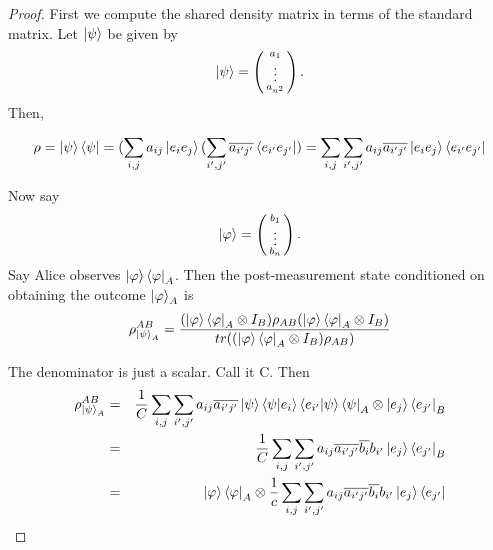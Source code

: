 \begin{proof}
First we compute the shared density matrix in terms of the standard matrix.  Let $\ket{\psi}$ be given by 
\begin{equation}
\ket{\psi}=\left(\begin{smallmatrix}a_1\\ \vdots \\a_{n^2}\end{smallmatrix}\right).
\end{equation}
Then, 

\begin{equation}
\rho=\ket{\psi}\bra{\psi}=(\sum_{i,j} a_{ij}\ket{e_i e_j}(\sum_{i',j'} \overline{a_{i'j'}}\bra{e_{i'} e_{j'}})=\sum_{i,j} \sum_{i',j'} a_{ij} \overline{a_{i'j'}}\ket{e_i e_j}\bra{e_{i'} e_{j'}}   
\end{equation}

Now say
\begin{equation}
\ket{\varphi}=\left(\begin{smallmatrix}b_1\\ \vdots \\b_n\end{smallmatrix}\right).
\end{equation}
Say Alice observes $\ket{\varphi}\bra{\varphi}_A$.
Then the post-measurement state conditioned on obtaining the outcome $\ket{\varphi}_A$ is
\begin{equation}
\rho_{\ket{\psi}_A}^{AB}=\frac{(\ket{\varphi}\bra{\varphi}_A \otimes I_B)\rho_{AB}(\ket{\varphi}\bra{\varphi}_A \otimes I_B)}{tr((\ket{\varphi}\bra{\varphi}_A \otimes I_B)\rho_{AB})}
\end{equation}

The denominator is just a scalar. Call it C. Then 
\begin{eqnarray}
\rho_{\ket{\psi}_A}^{AB}&=&\frac{1}{C} \sum_{i,j} \sum_{{i'}, {j'}} a_{ij} \overline{a_{i'j'}}\ket{\psi}\braket{\psi|e_i}\braket{e_{i'}|\psi}\bra{\psi}_A \otimes \ket{e_j}\bra{e_{j'}}_B\\
&=&\frac{1}{C} \sum_{i,j} \sum_{{i'}, {j'}} a_{ij} \overline{a_{i'j'}}\overline{b_i}b_{i'}\ket{e_j}\bra{e_{j'}}_B\\
&=&\ket{\varphi}\bra{\varphi}_A \otimes \frac{1}{c} \sum_{i,j} \sum_{{i'}, {j'}} a_{ij} \overline{a_{i'j'}}\overline{b_i}b_{i'}\ket{e_j}\bra{e_{j'}}
\end{eqnarray}


\end{proof}
